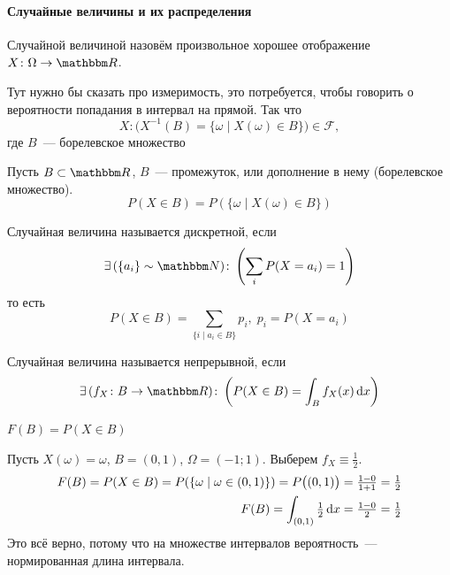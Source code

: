 \documentclass[12pt,hardcopy]{../../../notes}
\begin{document}
\paragraph{Случайные величины и их распределения}
\label{par:prob::randscal}

\begin{defn}\label{defn:prob::randscal::randscal}
  Случайной величиной назовём произвольное хорошее отображение $X\colon \Omega \to \R$.
  
  \begin{itaux}\label{rem:prob::randscal::meas}
    Тут нужно бы сказать про измеримость, это потребуется, чтобы говорить о вероятности попадания в
    интервал на прямой. Так что \[
      X\colon \bigl(X^{-1} (B) =\{\omega \mid X(\omega)\in B\}\bigr)\in \mathcal F,
    \]
    где $B$~--- борелевское множество
  \end{itaux}

\end{defn}

\begin{defn}\label{defn:prob::randscal::inborel}
  Пусть $B\subset \R$, $B$~--- промежуток, или дополнение в нему (борелевское множество).
  \[
    P(X\in B) = P(\{\omega \mid X(\omega) \in B\})
  \]
\end{defn}

\begin{defn}\label{defn:prob::randscal::disc}
  Случайная величина называется дискретной, если
  \[
    \exists\,(\{a_i\} \sim \N)\colon \left( \sum_{i} P(X = a_i) = 1 \right)
  \]
  то есть 
  \[
    P(X\in B) = \sum_{\{i\mid a_i\in B\}} p_i, \; p_i = P(X = a_i)
  \]
\end{defn}
\begin{defn}\label{defn:prob::randscal::cony}
  Случайная величина называется непрерывной, если
  \[
    \exists\,(f_X\colon B\to \R )\colon \left( P(X\in B) = \int_{B} f_X(x)\, \del x \right)
  \]
\end{defn}
\begin{defn}\label{defn:prob::randscal::distr}
  $F(B) = P(X \in B)$
\end{defn}

\begin{exmp}\label{exmp:prob::randscal::cont}
  Пусть $X(\omega) = \omega$, $B = (0,1)$, $\Omega = (-1;1)$. Выберем  $f_X \equiv \frac{1}{2}$.
  \begin{align*}
    F(B) = P(X\in B) = P(\{\omega \mid \omega \in (0,1)\}) = P\bigl((0,1)\bigr) = \tfrac{1-0}{1+1}
    = \tfrac{1}{2} \\
    F(B) = \int_{(0,1)} \tfrac{1}{2}\, \mathrm{d} x  = \tfrac{1-0}{2} = \tfrac{1}{2}
  \end{align*}
  Это всё верно, потому что на множестве интервалов вероятность~--- нормированная длина интервала.
\end{exmp}
\end{document}
